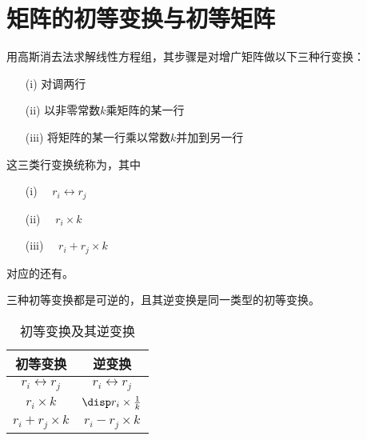 \section{矩阵的初等变换与初等矩阵}

\begin{frame}
  \begin{footnotesize}
    用高斯消去法求解线性方程组，其步骤是对增广矩阵做以下三种行变换：
    \begin{itemize}
    \item[(i)] 对调两行\\[0.2cm]
    \item[(ii)] 以非零常数$k$乘矩阵的某一行\\[0.2cm]
    \item[(iii)] 将矩阵的某一行乘以常数$k$并加到另一行\\[0.4cm]
    \end{itemize}
    \pause 
    这三类行变换统称为，其中
    \begin{itemize}
    \item[(i)]   $\quad r_i \leftrightarrow r_j$
    \item[(ii)]        $\quad r_i \times k$
    \item[(iii)]  $\quad r_i + r_j \times k $\\[0.3cm]
    \end{itemize}
    \pause
    对应的还有。 
    
  \end{footnotesize}
\end{frame}

\begin{frame}
  \begin{footnotesize}
    三种初等变换都是可逆的，且其逆变换是同一类型的初等变换。
    
    \begin{center}
      \begin{table}
        \caption{初等变换及其逆变换}
        \begin{tabular}{|c|c|} \hline
          初等变换 &  逆变换 \\\hline
          $r_i \leftrightarrow r_j$ & $r_i \leftrightarrow r_j$ \\[0.2cm]\hline
          $r_i \times k$ & $\disp r_i \times \frac1k$ \\[0.2cm]\hline
          $r_i + r_j \times k$ & $r_i - r_j\times k$ \\[0.2cm]\hline
        \end{tabular}
        
      \end{table}
    \end{center}
  \end{footnotesize}
\end{frame}



